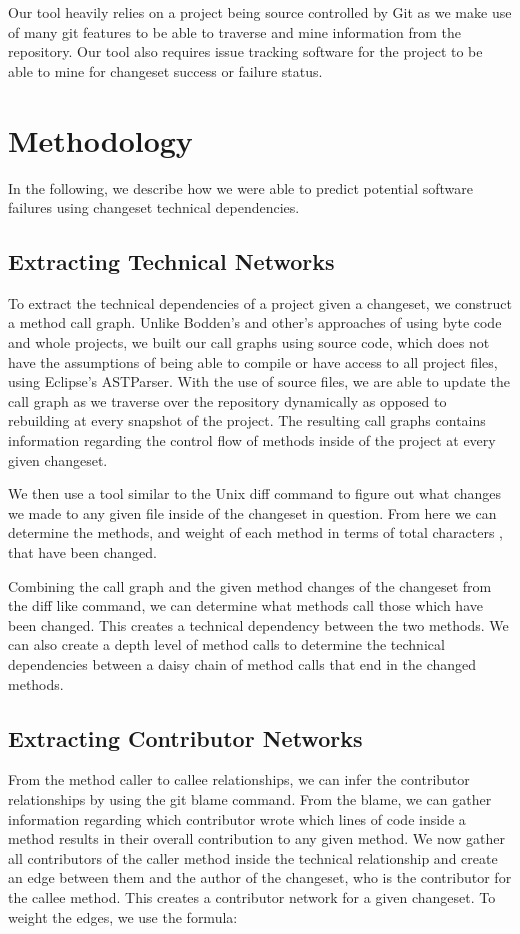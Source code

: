 \documentclass[conference]{IEEEtran}
\begin{document}
Our tool heavily relies on a project being source controlled by Git as we make use of many
git features to be able to traverse and mine information from the repository. Our tool also
requires issue tracking software for the project to be able to mine for changeset success or
failure status.


\section{Methodology}
In the following, we describe how we were able to predict potential software failures using changeset
technical dependencies.

\subsection{Extracting Technical Networks}
To extract the technical dependencies of a project given a changeset, we construct a method
call graph. Unlike  Bodden's \cite{Bodden:2003:HVJ} and other's approaches of using byte code
and whole projects, we built our call graphs using source code, which does not have the assumptions
of being able to compile or have access to all project files, using Eclipse's ASTParser. 
With the use of source files, we are able
to update the call graph as we traverse over the repository dynamically as opposed to rebuilding
at every snapshot of the project. The resulting call graphs contains information regarding the control
flow of methods inside of the project at every given changeset.

We then use a tool similar to the Unix diff command to figure out what changes we made to any given
file inside of the changeset in question. From here we can determine the methods, and weight
of each method in terms of total characters , that have been changed.

Combining the call graph and the given method changes of the changeset from the diff like command,
we can determine what methods call those which have been changed. This creates a technical
dependency between the two methods. We can also create a depth level of method calls to determine
the technical dependencies between a daisy chain of method calls that end in the changed methods.

\subsection{Extracting Contributor Networks}
From the method caller to callee relationships, we can infer the contributor relationships by using
the git blame command. From the blame, we can gather information regarding which contributor 
wrote which lines of code inside a method results in their overall contribution to any given method.
We now gather all contributors of the caller method inside the technical relationship and create an
edge between them and the author of the changeset, who is the contributor for the callee method.
This creates a contributor network for a given changeset. To weight the edges, we use the formula:
\end{document}
